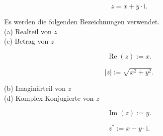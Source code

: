 \documentclass[10pt]{article}
\begin{document}
\begin{equation*}
z=x+y \cdot \mathrm{i} . \tag{5.6}
\end{equation*}


Es werden die folgenden Bezeichnungen verwendet.\\
(a) Realteil von $z$\\
(c) Betrag von $z$

$$
\operatorname{Re}(z):=x .
$$

$$
|z|:=\sqrt{x^{2}+y^{2}} .
$$

(b) Imaginärteil von $z$\\
(d) Komplex-Konjugierte von $z$

$$
\operatorname{Im}(z):=y .
$$

$$
z^{*}:=x-y \cdot \mathrm{i} .
$$
\end{document}
